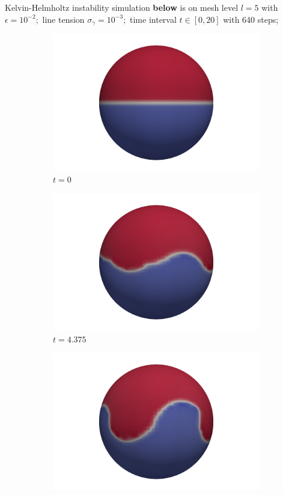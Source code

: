\documentclass{article}
\begin{document}
Kelvin-Helmholtz instability simulation \textbf{below} is on mesh level $l=5$ with $\epsilon = 10^{-2};$ line tension $\sigma_\gamma = 10^{-3};$ time interval $t\in [0,20]$ with  640 steps;\\
\begin{figure}[h]
	\centering
	\begin{subfigure}[b]{0.15\textwidth}
		\includegraphics[scale=0.1]{images/c0.png}
		\caption{$t=0$}
	\end{subfigure} 
\begin{subfigure}[b]{0.15\textwidth}
	\includegraphics[scale=0.1]{images/c4375.png}
	\caption{$t=4.375$}
\end{subfigure}
\begin{subfigure}[b]{0.15\textwidth}
	\includegraphics[scale=0.1]{images/c5.png}

\end{subfigure}
\end{figure}
\end{document}
